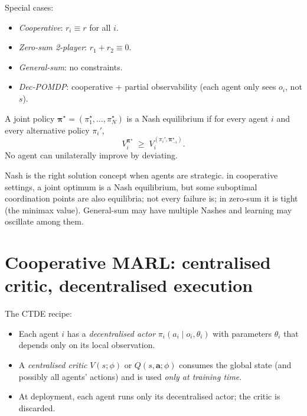 \documentclass[11pt,oneside]{scrbook}
\begin{document}
Special cases:
\begin{itemize}\setlength\itemsep{1pt}
  \item \emph{Cooperative}: $r_i \equiv r$ for all $i$.
  \item \emph{Zero-sum 2-player}: $r_1 + r_2 \equiv 0$.
  \item \emph{General-sum}: no constraints.
  \item \emph{Dec-POMDP}: cooperative + partial observability (each agent
        only sees $o_i$, not $s$).
\end{itemize}

\begin{definition}
A joint policy $\boldsymbol{\pi}^\star = (\pi_1^\star, \dots, \pi_N^\star)$ is
a Nash equilibrium if for every agent $i$ and every alternative policy
$\pi_i'$,
\[
V_i^{\boldsymbol{\pi}^\star} \;\geq\; V_i^{(\pi_i', \boldsymbol{\pi}_{-i}^\star)}.
\]
No agent can unilaterally improve by deviating.
\end{definition}

\begin{intuition}
Nash is the right solution concept when agents are strategic. in cooperative settings, a joint optimum is a Nash equilibrium, but
some suboptimal coordination points are also equilibria; not every failure is; in zero-sum it is tight (the
minimax value). General-sum may have multiple Nashes and learning may
oscillate among them.
\end{intuition}

\section{Cooperative MARL: centralised critic, decentralised execution}

The CTDE recipe:
\begin{itemize}\setlength\itemsep{1pt}
  \item Each agent $i$ has a \emph{decentralised actor} $\pi_i(a_i \mid o_i, \theta_i)$
        with parameters $\theta_i$ that depends only on its local observation.
  \item A \emph{centralised critic} $V(s; \phi)$ or $Q(s, \mathbf{a}; \phi)$
        consumes the global state (and possibly all agents' actions) and
        is used \emph{only at training time}.
  \item At deployment, each agent runs only its decentralised actor; the
        critic is discarded.
\end{itemize}
\end{document}
